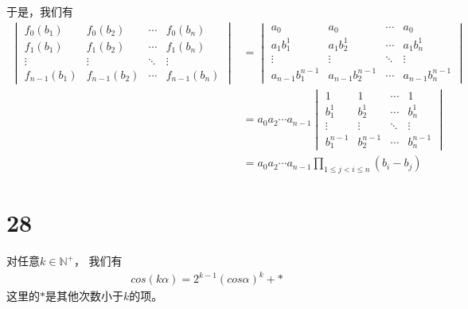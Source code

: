 \documentclass{article}
\begin{document}
于是，我们有
\begin{align*}
  \begin{vmatrix}
    f_0(b_1)     & f_0(b_2)     & \cdots & f_0(b_n)     \\
    f_1(b_1)     & f_1(b_2)     & \cdots & f_1(b_n)     \\
    \vdots       & \vdots       & \ddots & \vdots       \\
    f_{n-1}(b_1) & f_{n-1}(b_2) & \cdots & f_{n-1}(b_n)
  \end{vmatrix}
   & = \begin{vmatrix}
         a_0               & a_0              & \cdots & a_0               \\
         a_1 b_1^1         & a_1 b_2^1        & \cdots & a_1 b_n^1         \\
         \vdots            & \vdots           & \ddots & \vdots            \\
         a_{n-1} b_1^{n-1} & a_{n-1}b_2^{n-1} & \cdots & a_{n-1} b_n^{n-1}
       \end{vmatrix}        \\
   & = a_0 a_2 \cdots a_{n - 1} \begin{vmatrix}
                                  1         & 1         & \cdots & 1         \\
                                  b_1^1     & b_2^1     & \cdots & b_n^1     \\
                                  \vdots    & \vdots    & \ddots & \vdots    \\
                                  b_1^{n-1} & b_2^{n-1} & \cdots & b_n^{n-1}
                                \end{vmatrix}      \\
   & = a_0 a_2 \cdots a_{n - 1}  \prod\limits_{1 \leq j < i \leq n} (b_i - b_j)
\end{align*}

\section*{28}

对任意$k \in \mathbb{N}^{+}$，
我们有
\begin{align*}
  cos(k \alpha) = 2^{k - 1} (cos \alpha)^k + *
\end{align*}
这里的$*$是其他次数小于$k$的项。
\end{document}
